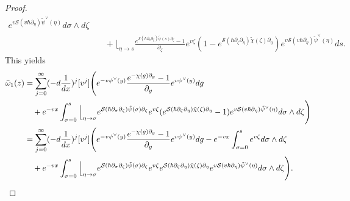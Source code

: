 \documentclass[10pt,a4paper,oneside,no-math,reqno]{amsart}%
\theoremstyle{plain}
\theoremstyle{definition}
\theoremstyle{remark}
\numberwithin{equation}{section}
\newcommand{\mc}[1]{\mathcal{#1}}
\newcommand{\1}{\mathds{1}}
\newcommand{\<}{\langle}
\renewcommand{\>}{\rangle}
\newcommand{\del}{\partial}
\begin{document}
\begin{proof}
\begin{equation*}
\begin{split}
			e^{v \mc{S}(v\hbar \del_{\eta}) \tilde{\psi}^\vee(\eta) } d\sigma \wedge d\zeta
			\\
			&\quad
			+
			\Big\lfloor_{\eta \to s} \frac{e^{ \mc{S}(\hbar \del_s \del_\zeta) \tilde{\psi}(s) \del_\zeta} - 1}{\del_\zeta} e^{v\zeta} (1 - e^{ \mc{S}(\hbar \del_\zeta \del_\eta) \tilde{\chi}(\zeta) \del_\eta } )
			e^{v \mc{S}(v\hbar \del_{\eta}) \tilde{\psi}^\vee(\eta) } ds .
		\end{split}
	\end{equation*}
	This yields
	\begin{align*}
			\bar{\omega}_1 (z)
      &=
      \sum_{j=0}^\infty (-d \frac{1}{dx})^j [v^j ] 
			\Bigg( 
      e^{-v \psi^\vee (y)}  \frac{e^{-\chi (g) \del_y} - 1}{\del_y} e^{v \psi^\vee (y )} dg 
      \\
      &\quad
      + 
      e^{-vx}
      \int_{\sigma = 0}^s \Big\lfloor_{\eta \to \sigma} e^{ \mc{S}(\hbar \del_\sigma \del_\zeta) \tilde{\psi}(\sigma) \del_\zeta} e^{v\zeta} (e^{ \mc{S}(\hbar \del_\zeta \del_\eta) \tilde{\chi}(\zeta) \del_\eta } -1  )
			e^{v \mc{S}(v\hbar \del_{\eta}) \tilde{\psi}^\vee(\eta) } d\sigma \wedge d\zeta
      \Bigg) 
      \\
      &=
      \sum_{j=0}^\infty (-d \frac{1}{dx})^j [v^j ] 
			\Bigg( 
      e^{-v \psi^\vee (y)}  \frac{e^{-\chi (g) \del_y} - 1}{\del_y} e^{v \psi^\vee (y )} dg
      - 
      e^{-vx}
      \int_{\sigma = 0}^s e^{v\zeta} d\sigma \wedge d\zeta
      \\
      &\quad
      + 
      e^{-vx}
      \int_{\sigma = 0}^s \Big\lfloor_{\eta \to \sigma} e^{ \mc{S}(\hbar \del_\sigma \del_\zeta) \tilde{\psi}(\sigma) \del_\zeta} e^{v\zeta} e^{ \mc{S}(\hbar \del_\zeta \del_\eta) \tilde{\chi}(\zeta) \del_\eta } 
			e^{v \mc{S}(v\hbar \del_{\eta}) \tilde{\psi}^\vee(\eta) } d\sigma \wedge d\zeta
      \Bigg) . \qedhere
	\end{align*}
\end{proof}
\end{document}
